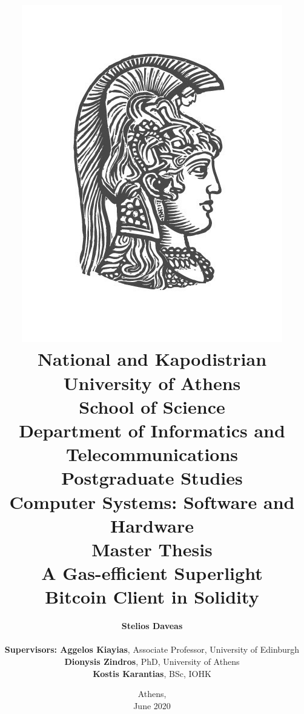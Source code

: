 \title{
    {\includegraphics[scale=0.8]{figures/logo_uoa.jpg}}\\
    {\large National and Kapodistrian University of Athens \\
    School of Science \\
    Department of Informatics and Telecommunications}\\
    \vspace{1cm}
    Postgraduate Studies \\
    Computer Systems: Software and Hardware\\
    \vspace{10mm}
    {Master Thesis}\\
    \vspace{3mm}
    {\textbf{\LARGE A Gas-efficient Superlight\\Bitcoin Client in Solidity}}
    }

\author{
    \textbf{Stelios Daveas} \\
    \vspace{1cm} \\
    \textbf{Supervisors: Aggelos Kiayias}, Associate Professor, University of Edinburgh\\
    \hspace{-0.60cm}
    \textbf{Dionysis Zindros}, PhD, University of Athens\\
    \hspace{-3.70cm}
    \textbf{Kostis Karantias}, BSc, IOHK
    \vspace{2cm}
}

\date{Athens, \\ June 2020}
